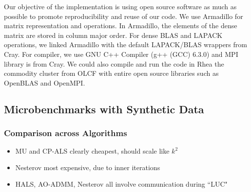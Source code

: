 Our objective of the implementation is using open source software as much as possible 
to promote reproducibility and reuse of our code.
We use Armadillo \cite{sanderson2010} for matrix representation
and operations.  
In Armadillo, the elements of the dense matrix are stored in column major order.
For dense BLAS and LAPACK operations, we linked Armadillo with the default LAPACK/BLAS wrappers from Cray. 
For compiler, we use GNU C++ Compiler (g++ (GCC) 6.3.0) and MPI library is from Cray.  We could also 
compile and run the code in Rhea the commodity cluster from OLCF with entire open source libraries such as OpenBLAS and OpenMPI. 

\subsection{Microbenchmarks with Synthetic Data}

\subsubsection{Comparison across Algorithms}

\begin{itemize}
	\item MU and CP-ALS clearly cheapest, should scale like $k^2$
	\item Nesterov most expensive, due to inner iterations
	\item HALS, AO-ADMM, Nesterov all involve communication during ``LUC"
\end{itemize}


